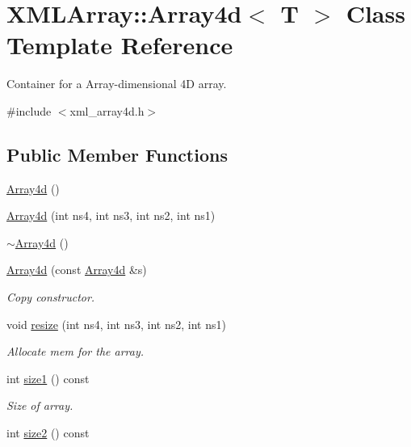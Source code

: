\hypertarget{classXMLArray_1_1Array4d}{}\section{X\+M\+L\+Array\+:\+:Array4d$<$ T $>$ Class Template Reference}
\label{classXMLArray_1_1Array4d}


Container for a Array-\/dimensional 4D array.  




{\ttfamily \#include $<$xml\+\_\+array4d.\+h$>$}

\subsection*{Public Member Functions}
\begin{DoxyCompactItemize}
\item 
\mbox{\hyperlink{classXMLArray_1_1Array4d_a4ce7f5a0bcb93fd0bd98a5fa0eb09a3d}{Array4d}} ()
\item 
\mbox{\hyperlink{classXMLArray_1_1Array4d_a409005374380cbfb8553f3237db7990b}{Array4d}} (int ns4, int ns3, int ns2, int ns1)
\item 
\mbox{\hyperlink{classXMLArray_1_1Array4d_a80523fcfbd3cf8493a2f5928dd9a3f15}{$\sim$\+Array4d}} ()
\item 
\mbox{\hyperlink{classXMLArray_1_1Array4d_aa288af6ef6ecbd04554a984ce1514c01}{Array4d}} (const \mbox{\hyperlink{classXMLArray_1_1Array4d}{Array4d}} \&s)
\begin{DoxyCompactList}\small\item\em Copy constructor. \end{DoxyCompactList}\item 
void \mbox{\hyperlink{classXMLArray_1_1Array4d_a8726b8005ecb501662b5e76873702480}{resize}} (int ns4, int ns3, int ns2, int ns1)
\begin{DoxyCompactList}\small\item\em Allocate mem for the array. \end{DoxyCompactList}\item 
int \mbox{\hyperlink{classXMLArray_1_1Array4d_a27899b6dccfd5d85d299da80da9a4c14}{size1}} () const
\begin{DoxyCompactList}\small\item\em Size of array. \end{DoxyCompactList}\item 
int \mbox{\hyperlink{classXMLArray_1_1Array4d_a18c3f8237c652b642c5de6df15764c34}{size2}} () const

\end{DoxyCompactItemize}
